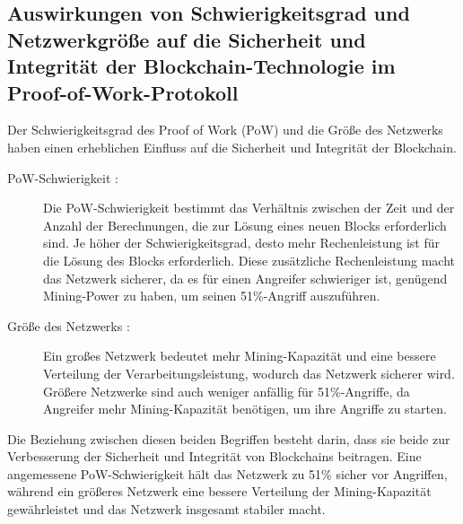 \subsection{Auswirkungen von Schwierigkeitsgrad und Netzwerkgröße auf die Sicherheit und Integrität der Blockchain-Technologie im Proof-of-Work-Protokoll}
Der Schwierigkeitsgrad des Proof of Work (PoW) und die Größe des Netzwerks haben einen erheblichen Einfluss auf die Sicherheit und Integrität der Blockchain.
\begin{description}
	\item[PoW-Schwierigkeit : ] Die PoW-Schwierigkeit bestimmt das Verhältnis zwischen der Zeit und der Anzahl der Berechnungen, die zur Lösung eines neuen Blocks erforderlich sind. Je höher der Schwierigkeitsgrad, desto mehr Rechenleistung ist für die Lösung des Blocks erforderlich. Diese zusätzliche Rechenleistung macht das Netzwerk sicherer, da es für einen Angreifer schwieriger ist, genügend Mining-Power zu haben, um seinen 51\%-Angriff auszuführen.
	\item[Größe des Netzwerks : ] Ein großes Netzwerk bedeutet mehr Mining-Kapazität und eine bessere Verteilung der Verarbeitungsleistung, wodurch das Netzwerk sicherer wird. Größere Netzwerke sind auch weniger anfällig für 51\%-Angriffe, da Angreifer mehr Mining-Kapazität benötigen, um ihre Angriffe zu starten.
\end{description}
Die Beziehung zwischen diesen beiden Begriffen besteht darin, dass sie beide zur Verbesserung der Sicherheit und Integrität von Blockchains beitragen. Eine angemessene PoW-Schwierigkeit hält das Netzwerk zu 51\% sicher vor Angriffen, während ein größeres Netzwerk eine bessere Verteilung der Mining-Kapazität gewährleistet und das Netzwerk insgesamt stabiler macht. 



